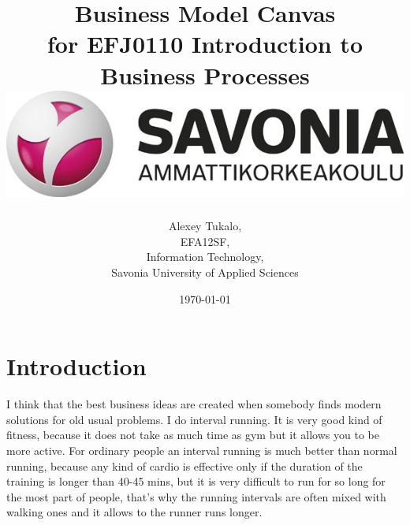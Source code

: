 \documentclass[english]{article}
\date{}
\begin{document}
\title{\vspace{2in}Business Model Canvas\\
\small for EFJ0110 Introduction to Business Processes\\
\vspace{0.5in}\includegraphics{savonia.jpg}}



\nopagebreak
\maketitle


\vspace{3in}

\author{
\begin{flushright}
Alexey Tukalo,\\
EFA12SF,\\
Information Technology,\\
Savonia University of Applied Sciences
\end{flushright}
}

\date{\today}
\thispagestyle{empty}

\newpage
\setcounter{page}{1}
\setcounter{tocdepth}{2}
\tableofcontents

\newpage

\section{Introduction}


I think that the best business ideas are created when somebody finds modern solutions
for old usual problems. I do interval running. It is very good kind of fitness, because it
does not take as much time as gym but it allows you to be more active. For ordinary people an interval running is much better than normal running, because any kind of cardio is
effective only if the duration of the training is longer than 40-45 mins, but it is very
difficult to run for so long for the most part of people, that’s why the running intervals
are often mixed with walking ones and it allows to the runner runs longer.
\end{document}
